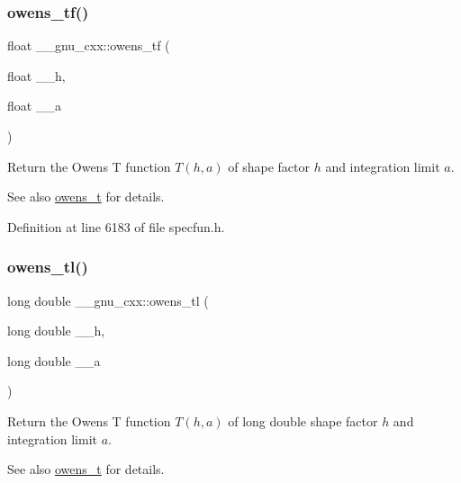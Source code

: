 \subsubsection{\texorpdfstring{owens\+\_\+tf()}{owens\_tf()}}
{\footnotesize\ttfamily float \+\_\+\+\_\+gnu\+\_\+cxx\+::owens\+\_\+tf (\begin{DoxyParamCaption}\item[{float}]{\+\_\+\+\_\+h,  }\item[{float}]{\+\_\+\+\_\+a }\end{DoxyParamCaption})\hspace{0.3cm}{\ttfamily [inline]}}

Return the Owens T function $ T(h,a) $ of shape factor $ h $ and integration limit $ a $.

\begin{DoxySeeAlso}{See also}
\hyperlink{group__gnu__math__spec__func_gab4e367aae19853cca3af99eead01fcaa}{owens\+\_\+t} for details. 
\end{DoxySeeAlso}


Definition at line 6183 of file specfun.\+h.

\mbox{\label{group__gnu__math__spec__func_ga7a8bc60dc0ef4a009586872eb7cac2d0}} 
\subsubsection{\texorpdfstring{owens\+\_\+tl()}{owens\_tl()}}
{\footnotesize\ttfamily long double \+\_\+\+\_\+gnu\+\_\+cxx\+::owens\+\_\+tl (\begin{DoxyParamCaption}\item[{long double}]{\+\_\+\+\_\+h,  }\item[{long double}]{\+\_\+\+\_\+a }\end{DoxyParamCaption})\hspace{0.3cm}{\ttfamily [inline]}}

Return the Owens T function $ T(h,a) $ of {\ttfamily long double} shape factor $ h $ and integration limit $ a $.

\begin{DoxySeeAlso}{See also}
\hyperlink{group__gnu__math__spec__func_gab4e367aae19853cca3af99eead01fcaa}{owens\+\_\+t} for details. 
\end{DoxySeeAlso}


